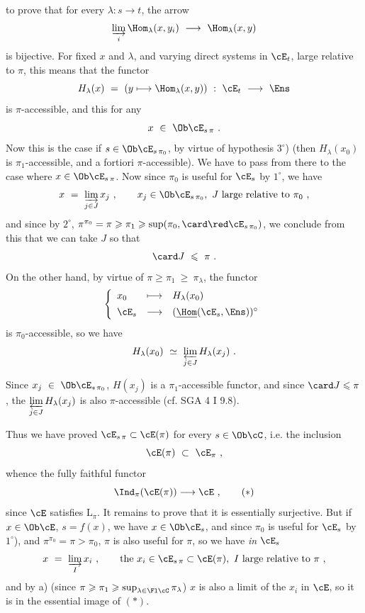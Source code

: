
to prove that for every $\lambda : s \longrightarrow t$, the arrow
\[
\varinjlim_{i} \Hom_{\lambda}(x, y_i) \ \longrightarrow \ \Hom_{\lambda}(x, y)
\]
is bijective. For fixed $x$ and $\lambda$, and varying direct systems in $\cE_t$, large relative to $\pi$, this means that the functor
\[
H_{\lambda}(x) \ = \ (y \longmapsto \Hom_{\lambda}(x, y)) \ : \ \cE_t \ \longrightarrow \ \Ens
\]
is $\pi$-accessible, and this for any
\[
x \ \in \ \Ob \cE_{s\,\pi} \ .
\]
Now this is the case if $s \in \Ob \cE_{s\,\pi_0}$, by virtue of hypothesis $3^{\circ}$) (then $H_{\lambda}(x_0)$ is $\pi_1$-accessible, %
and a fortiori $\pi$-accessible). We have to pass from there to the case where $x \in \Ob \cE_{s\,\pi}$. Now since $\pi_0$ is useful for $\cE_s$ by $1^{\circ}$, we have
\[
x \ = \ \varinjlim_{j \in J} x_j \ , \qquad x_j \in \Ob \cE_{s\,\pi_0},\ J \text{ large relative to } \pi_0 \ ,
\]
and since by $2^{\circ}$, $\pi^{\pi_0} = \pi \geqslant \pi_1 \geqslant \sup(\pi_0, \card \red \cE_{s\,\pi_0})$, we conclude from this that we can take $J$ so that
\[
\card J \ \leqslant \ \pi \ .
\]
On the other hand, by virtue of $\pi \geqslant \pi_1 \ \geqslant \ \pi_{\lambda}$, the functor
\[
\left\{
\begin{array}{lcl}
x_0 & \longmapsto & H_{\lambda}(x_0) \\[1ex]
\cE_s & \longrightarrow & (\underline{\Hom}(\cE_s, \Ens))^{\circ}
\end{array}
\right.
\]
is $\pi_0$-accessible, so we have
\[
H_{\lambda}(x_0) \ \simeq \ \varprojlim_{j \in J} H_{\lambda}(x_j) \ .
\]

Since $x_j \ \in \ \Ob \cE_{s\,\pi_0}$, $H(x_j)$ is a $\pi_1$-accessible functor, and since $\card J \leqslant \pi$, the $\varprojlim\limits_{j \in J} H_{\lambda}(x_j)$ is also $\pi$-accessible (cf. SGA 4 I 9.8).

Thus we have proved $\cE_{s\,\pi} \subset \cE(\pi)$ for every $s \in \Ob \cC$, i.e. the inclusion
\[
\cE(\pi) \ \subset \ \cE_{\pi} \ ,
\]
whence the fully faithful functor
\[
\Ind_{\pi}(\cE(\pi)) \longrightarrow \cE \ , \tag*{$(*)$}
\]
since $\cE$ satisfies $\mathrm{L}_{\pi}$. It remains to prove that it is essentially surjective. But if $x \in \Ob \cE$, $s = f(x)$, we have $x \in \Ob \cE_s$, and since $\pi_0$ is useful for $\cE_s$ by $1^{\circ}$), and $\pi^{\pi_0} = \pi > \pi_0$,
$\pi$ is also useful for $\pi$, so we have \textit{in} $\cE_s$ %
\[
x \ = \ \varinjlim_{I} x_i \ , \qquad \text{the } x_i \in \cE_{s\,\pi} \subset \cE(\pi),\ I \text{ large relative to } \pi \ ,
\]
and by a) (since $\pi \geqslant \pi_1 \geqslant \sup_{\lambda \in \Fl \cC} \pi_{\lambda}$) $x$ is also a limit of the $x_i$ in $\cE$, so it is in the essential image of $(*)$.

